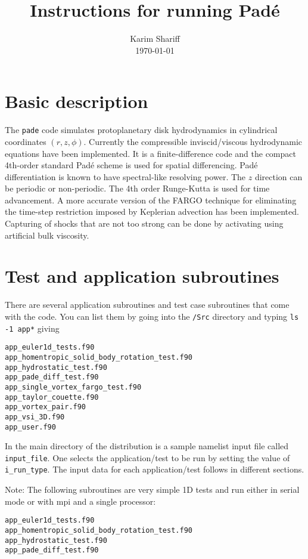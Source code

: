 \documentclass[11pt]{amsart}
\title{Instructions for running {\sc Pad\'e}}
\author{Karim Shariff \\ \today}
\begin{document}
\maketitle

\section{Basic description}
The {\tt pade} code simulates protoplanetary disk hydrodynamics in cylindrical coordinates
$(r, z, \phi)$.  Currently the compressible inviscid/viscous hydrodynamic equations have been implemented.
It is a finite-difference code and the compact 4th-order standard Pad\'e scheme is used for spatial differencing.  
Pad\'e differentiation is known to have spectral-like resolving power.  The $z$ direction can be periodic or
non-periodic.  The 4th order Runge-Kutta is used for time advancement.  
A more accurate version of the FARGO technique for eliminating the time-step restriction imposed by Keplerian advection has been implemented.  Capturing of shocks that are not too strong can be done by activating using artificial bulk viscosity.

\section{Test and application subroutines}

There are several application subroutines and test case subroutines that come with the code.  You can list them by going into the {\tt /Src} directory and typing {\tt ls -1 app*} giving

\begin{verbatim}
app_euler1d_tests.f90
app_homentropic_solid_body_rotation_test.f90
app_hydrostatic_test.f90
app_pade_diff_test.f90
app_single_vortex_fargo_test.f90
app_taylor_couette.f90
app_vortex_pair.f90
app_vsi_3D.f90
app_user.f90
\end{verbatim}

In the main directory of the distribution is a sample namelist input file called {\tt input\_file}.  One selects the application/test to be run by setting the value of {\tt i\_run\_type}.  The input data for each application/test follows in different sections.

Note: The following subroutines are very simple 1D tests and run either in serial mode or with mpi and a single processor:
\begin{verbatim}
app_euler1d_tests.f90
app_homentropic_solid_body_rotation_test.f90
app_hydrostatic_test.f90
app_pade_diff_test.f90
\end{verbatim}
\end{document}
